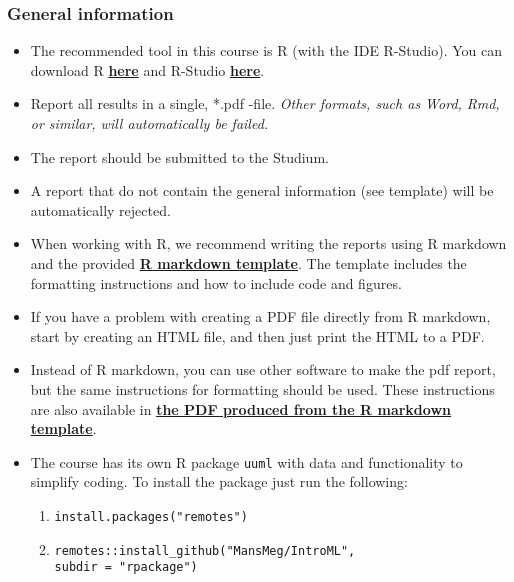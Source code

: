 
\subsubsection*{General information}


\begin{itemize}
\itemsep0em
\item The recommended tool in this course is R (with the IDE R-Studio). You can download R \href{https://cran.r-project.org/}{\textbf{here}} and R-Studio \href{https://www.rstudio.com/products/rstudio/download/}{\textbf{here}}.

\item  Report all results in a single, *.pdf -file. \emph{Other formats, such as Word, Rmd, or similar, will automatically be failed.}

\item The report should be submitted to the Studium.

\item A report that do not contain the general information (see template) will be automatically rejected.

\item When working with R, we recommend writing the reports using R markdown and the provided \href{https://raw.githubusercontent.com/MansMeg/IntroML/master/templates/assignment_template.rmd}{\textbf{R markdown template}}. The template includes the formatting instructions and how to include code and figures.

\item If you have a problem with creating a PDF file directly from R markdown, start by creating an HTML file, and then just print the HTML to a PDF.

\item Instead of R markdown, you can use other software to make the pdf report, but the same instructions for formatting should be used. These instructions are also available in \href{https://raw.githubusercontent.com/MansMeg/IntroML/master/templates/assignment_template.pdf}{\textbf{the PDF produced from the R markdown template}}.

\item The course has its own R package \texttt{uuml} with data and functionality to simplify coding. To install the package just run the following:
\begin{enumerate}
\item \texttt{install.packages("remotes")}
\item \texttt{remotes::install\_github("MansMeg/IntroML", \\ subdir = "rpackage")}
\end{enumerate}


\end{itemize}
